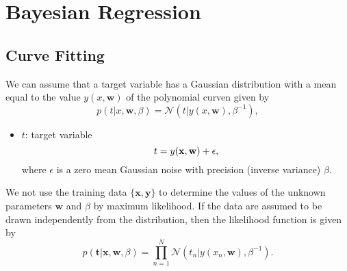 \chapter{Bayesian Regression}

\section{Curve Fitting}
We can assume that a target variable has a Gaussian distribution with a mean equal to the value $y(x,\mathbf{w})$ of the polynomial curven given by
\begin{equation}
	p(t|x, \mathbf{w}, \beta) = \mathcal{N}(t|y(x,\mathbf{w}), \beta^{-1}),
	\label{eq:curve}
\end{equation}
\begin{itemize}
	\item $t$: target variable
		$$t = y({\mathbf{x}}, {\mathbf{w}}) +\epsilon,$$
	where $\epsilon$ is a zero mean Gaussian noise with precision (inverse variance) $\beta$. 
\end{itemize}

We not use the training data $\{\mathbf{x,y}\}$ to determine the values of the unknown parameters $\mathbf{w}$ and $\beta$ by maximum likelihood. If the data are assumed to be drawn independently from the distribution, then the likelihood function is given by 
\begin{equation}
	p(\mathbf{t}|\mathbf{x,w},\beta) = \prod_{n=1}^{N}\mathcal{N}(t_n|y(x_n,\mathbf{w}), \beta^{-1}).
	\label{eq:curve_ml}
\end{equation}

